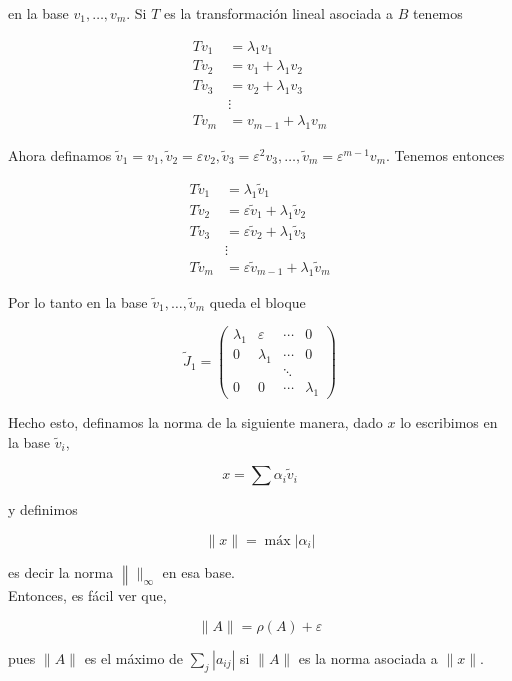 \documentclass[10pt]{book}
\begin{document}
en la base $v_{1}, \ldots, v_{m}$. Si $T$ es la transformación lineal asociada a $B$ tenemos

$$
\begin{aligned}
T v_{1} & =\lambda_{1} v_{1} \\
T v_{2} & =v_{1}+\lambda_{1} v_{2} \\
T v_{3} & =v_{2}+\lambda_{1} v_{3} \\
& \vdots \\
T v_{m} & =v_{m-1}+\lambda_{1} v_{m}
\end{aligned}
$$

Ahora definamos $\tilde{v}_{1}=v_{1}, \tilde{v}_{2}=\varepsilon v_{2}, \tilde{v}_{3}=\varepsilon^{2} v_{3}, \ldots, \tilde{v}_{m}=\varepsilon^{m-1} v_{m}$. Tenemos entonces

$$
\begin{aligned}
T \tilde{v}_{1} & =\lambda_{1} \tilde{v}_{1} \\
T \tilde{v}_{2} & =\varepsilon \tilde{v}_{1}+\lambda_{1} \tilde{v}_{2} \\
T \tilde{v}_{3} & =\varepsilon \tilde{v}_{2}+\lambda_{1} \tilde{v}_{3} \\
& \vdots \\
T \tilde{v}_{m} & =\varepsilon \tilde{v}_{m-1}+\lambda_{1} \tilde{v}_{m}
\end{aligned}
$$

Por lo tanto en la base $\tilde{v}_{1}, \ldots, \tilde{v}_{m}$ queda el bloque

$$
\tilde{J}_{1}=\left(\begin{array}{cccc}
\lambda_{1} & \varepsilon & \cdots & 0 \\
0 & \lambda_{1} & \cdots & 0 \\
& & \ddots & \\
0 & 0 & \cdots & \lambda_{1}
\end{array}\right)
$$

Hecho esto, definamos la norma de la siguiente manera, dado $x$ lo escribimos en la base $\tilde{v}_{i}$,

$$
x=\sum \alpha_{i} \tilde{v}_{i}
$$

y definimos

$$
\|x\|=\operatorname{máx}\left|\alpha_{i}\right|
$$

es decir la norma $\left\|\|_{\infty}\right.$ en esa base.\\
Entonces, es fácil ver que,

$$
\|A\|=\rho(A)+\varepsilon
$$

pues $\|A\|$ es el máximo de $\sum_{j}\left|a_{i j}\right|$ si $\|A\|$ es la norma asociada a $\|x\|$.
\end{document}
